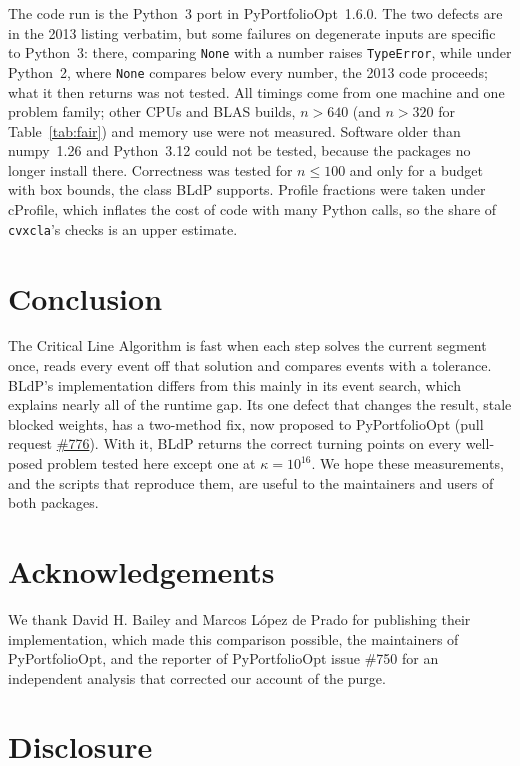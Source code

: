 \documentclass[11pt,a4paper]{article}
\newcommand{\code}[1]{\texttt{#1}}
\newcommand{\cvxcla}{\code{cvxcla}}
\begin{document}
The code run is the Python~3 port in PyPortfolioOpt~1.6.0. The two defects
are in the 2013 listing verbatim, but some failures on degenerate inputs are
specific to Python~3: there, comparing \code{None} with a number raises
\code{TypeError}, while under Python~2, where \code{None} compares below every
number, the 2013 code proceeds; what it then returns was not tested. All
timings come from one machine and one problem family; other CPUs and BLAS
builds, $n > 640$ (and $n > 320$ for Table~\ref{tab:fair}) and memory use were
not measured. Software older than numpy~1.26 and Python~3.12 could not be
tested, because the packages no longer install there. Correctness was tested
for $n \le 100$ and only for a budget with box bounds, the class BLdP supports.
Profile fractions were taken under cProfile, which inflates the cost of code
with many Python calls, so the share of \cvxcla{}'s checks is an upper
estimate.

\section{Conclusion}

The Critical Line Algorithm is fast when each step solves the current segment
once, reads every event off that solution and compares events with a
tolerance. BLdP's implementation differs from this mainly in its event search,
which explains nearly all of the runtime gap. Its one defect that changes the
result, stale blocked weights, has a two-method fix, now proposed to
PyPortfolioOpt (pull request
\href{https://github.com/PyPortfolio/PyPortfolioOpt/pull/776}{\#776}). With it,
BLdP returns the correct turning points on every well-posed problem tested here
except one at $\kappa = 10^{16}$. We hope these
measurements, and the scripts that reproduce them, are useful to the
maintainers and users of both packages.

\section*{Acknowledgements}

We thank David H. Bailey and Marcos López de Prado for publishing their
implementation, which made this comparison possible, the maintainers of
PyPortfolioOpt, and the reporter of PyPortfolioOpt issue \#750 for an
independent analysis that corrected our account of the purge.

\section*{Disclosure}
\end{document}
